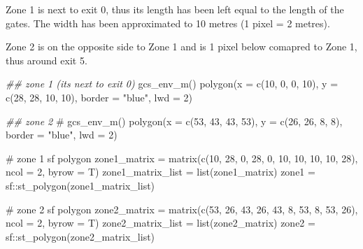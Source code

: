 \documentclass[
  letterpaper,
  DIV=11,
  numbers=noendperiod]{scrreprt}
\newenvironment{Shaded}{\begin{snugshade}}{\end{snugshade}}
\newcommand{\AttributeTok}[1]{\textcolor[rgb]{0.40,0.45,0.13}{#1}}
\newcommand{\CommentTok}[1]{\textcolor[rgb]{0.37,0.37,0.37}{#1}}
\newcommand{\DecValTok}[1]{\textcolor[rgb]{0.68,0.00,0.00}{#1}}
\newcommand{\DocumentationTok}[1]{\textcolor[rgb]{0.37,0.37,0.37}{\textit{#1}}}
\newcommand{\FunctionTok}[1]{\textcolor[rgb]{0.28,0.35,0.67}{#1}}
\newcommand{\NormalTok}[1]{\textcolor[rgb]{0.00,0.23,0.31}{#1}}
\newcommand{\OtherTok}[1]{\textcolor[rgb]{0.00,0.23,0.31}{#1}}
\newcommand{\SpecialCharTok}[1]{\textcolor[rgb]{0.37,0.37,0.37}{#1}}
\newcommand{\StringTok}[1]{\textcolor[rgb]{0.13,0.47,0.30}{#1}}
\begin{document}
Zone 1 is next to exit 0, thus its length has been left equal to the
length of the gates. The width has been approximated to 10 metres (1
pixel = 2 metres).

Zone 2 is on the opposite side to Zone 1 and is 1 pixel below comapred
to Zone 1, thus around exit 5.

\begin{Shaded}
\begin{Highlighting}[]
\DocumentationTok{\#\# zone 1 (it\textquotesingle{}s next to exit 0)}
\FunctionTok{gcs\_env\_m}\NormalTok{()}
\FunctionTok{polygon}\NormalTok{(}\AttributeTok{x =} \FunctionTok{c}\NormalTok{(}\DecValTok{10}\NormalTok{, }\DecValTok{0}\NormalTok{, }\DecValTok{0}\NormalTok{, }\DecValTok{10}\NormalTok{),}
        \AttributeTok{y =} \FunctionTok{c}\NormalTok{(}\DecValTok{28}\NormalTok{, }\DecValTok{28}\NormalTok{, }\DecValTok{10}\NormalTok{, }\DecValTok{10}\NormalTok{),}
        \AttributeTok{border =} \StringTok{"blue"}\NormalTok{,}
        \AttributeTok{lwd =} \DecValTok{2}\NormalTok{)}

\DocumentationTok{\#\# zone 2}
\CommentTok{\# gcs\_env\_m()}
\FunctionTok{polygon}\NormalTok{(}\AttributeTok{x =} \FunctionTok{c}\NormalTok{(}\DecValTok{53}\NormalTok{, }\DecValTok{43}\NormalTok{, }\DecValTok{43}\NormalTok{, }\DecValTok{53}\NormalTok{),}
        \AttributeTok{y =} \FunctionTok{c}\NormalTok{(}\DecValTok{26}\NormalTok{, }\DecValTok{26}\NormalTok{, }\DecValTok{8}\NormalTok{, }\DecValTok{8}\NormalTok{),}
        \AttributeTok{border =} \StringTok{"blue"}\NormalTok{,}
        \AttributeTok{lwd =} \DecValTok{2}\NormalTok{)}

\CommentTok{\# zone 1 sf polygon}
\NormalTok{zone1\_matrix }\OtherTok{=} \FunctionTok{matrix}\NormalTok{(}\FunctionTok{c}\NormalTok{(}\DecValTok{10}\NormalTok{, }\DecValTok{28}\NormalTok{, }\DecValTok{0}\NormalTok{, }\DecValTok{28}\NormalTok{, }\DecValTok{0}\NormalTok{, }\DecValTok{10}\NormalTok{, }\DecValTok{10}\NormalTok{, }\DecValTok{10}\NormalTok{, }\DecValTok{10}\NormalTok{, }\DecValTok{28}\NormalTok{),}
                      \AttributeTok{ncol =} \DecValTok{2}\NormalTok{,}
                      \AttributeTok{byrow =}\NormalTok{ T)}
\NormalTok{zone1\_matrix\_list }\OtherTok{=} \FunctionTok{list}\NormalTok{(zone1\_matrix)}
\NormalTok{zone1 }\OtherTok{=}\NormalTok{ sf}\SpecialCharTok{::}\FunctionTok{st\_polygon}\NormalTok{(zone1\_matrix\_list)}

\CommentTok{\# zone 2 sf polygon}
\NormalTok{zone2\_matrix }\OtherTok{=} \FunctionTok{matrix}\NormalTok{(}\FunctionTok{c}\NormalTok{(}\DecValTok{53}\NormalTok{, }\DecValTok{26}\NormalTok{, }\DecValTok{43}\NormalTok{, }\DecValTok{26}\NormalTok{, }\DecValTok{43}\NormalTok{, }\DecValTok{8}\NormalTok{, }\DecValTok{53}\NormalTok{, }\DecValTok{8}\NormalTok{, }\DecValTok{53}\NormalTok{, }\DecValTok{26}\NormalTok{),}
                      \AttributeTok{ncol =} \DecValTok{2}\NormalTok{,}
                      \AttributeTok{byrow =}\NormalTok{ T)}
\NormalTok{zone2\_matrix\_list }\OtherTok{=} \FunctionTok{list}\NormalTok{(zone2\_matrix)}
\NormalTok{zone2 }\OtherTok{=}\NormalTok{ sf}\SpecialCharTok{::}\FunctionTok{st\_polygon}\NormalTok{(zone2\_matrix\_list)}


\end{Highlighting}
\end{Shaded}
\end{document}
